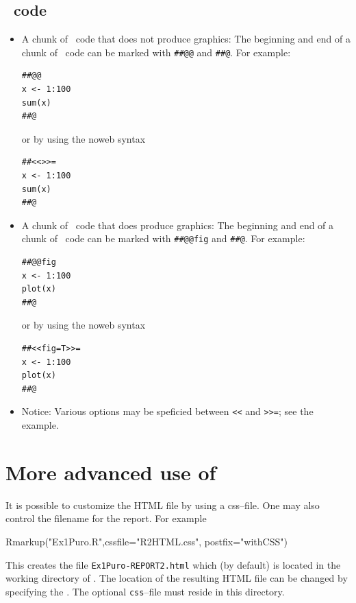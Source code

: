 \documentclass[11pt]{article}
\begin{document}
\subsection{\R\ code}
\label{sec:xxx}
\begin{itemize}
%
\item A chunk of \R\ code that does not produce graphics:
  The beginning and end of a chunk of \R\ code can be marked with
  \verb'##@@' and \verb'##@'. For example:
\begin{verbatim}
##@@
x <- 1:100
sum(x)
##@
\end{verbatim}
or by using  the noweb syntax
\begin{verbatim}
##<<>>=
x <- 1:100
sum(x)
##@
\end{verbatim}



\item A chunk of \R\ code that does produce graphics:
  The beginning and end of a chunk of \R\ code can be marked with
  \verb'##@@fig' and \verb'##@'. For example:
\begin{verbatim}
##@@fig
x <- 1:100
plot(x)
##@
\end{verbatim}
or by using the noweb syntax
\begin{verbatim}
##<<fig=T>>=
x <- 1:100
plot(x)
##@
\end{verbatim}

\item Notice: Various options may be speficied between  \verb'<<' and
  \verb'>>='; see the example.

\end{itemize}


\section{More advanced use of \rep}
\label{sec:xxx}

It is possible to customize the HTML file by using a css--file. One
may also control the filename for the report. For example
\begin{Schunk}
\begin{Sinput}
 Rmarkup("Ex1Puro.R",cssfile="R2HTML.css", postfix="withCSS")
\end{Sinput}
\end{Schunk}

This creates the file \verb'Ex1Puro-REPORT2.html' which (by
default) is located in the working directory of \R.
The location of the resulting HTML file can be changed by specifying
the .
The optional \verb'css'--file must
reside in this directory.
\end{document}
